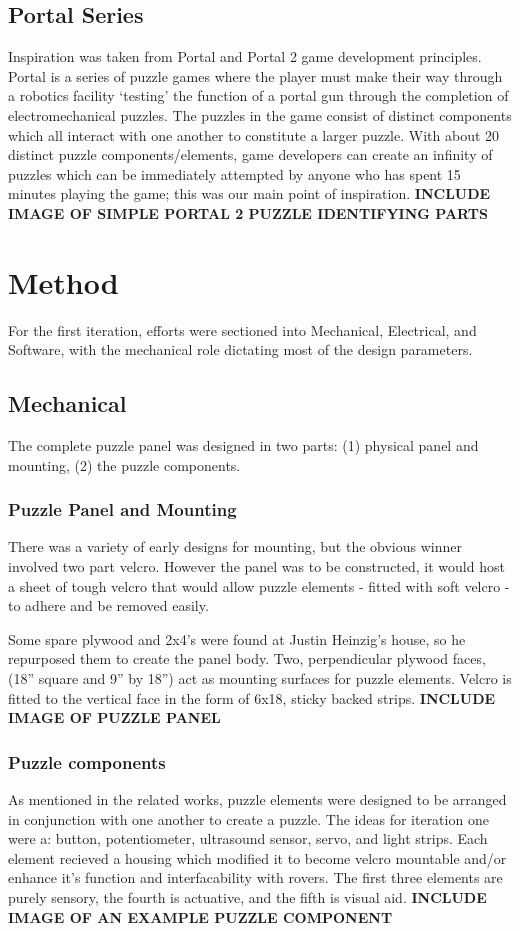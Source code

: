 \documentclass[conference]{IEEEtran}
\begin{document}
	\subsection{Portal Series}
	Inspiration was taken from Portal and Portal 2 game development principles. Portal is a series of puzzle games where the player must make their way through a robotics facility `testing' the function of a portal gun through the completion of electromechanical puzzles. The puzzles in the game consist of distinct components which all interact with one another to constitute a larger puzzle. With about 20 distinct puzzle components/elements, game developers can create an infinity of puzzles which can be immediately attempted by anyone who has spent 15 minutes playing the game; this was our main point of inspiration.
	\textbf{INCLUDE IMAGE OF SIMPLE PORTAL 2 PUZZLE IDENTIFYING PARTS}


\section{Method}
	For the first iteration, efforts were sectioned into Mechanical, Electrical, and Software, with the mechanical role dictating most of the design parameters.

	\subsection{Mechanical}
	The complete puzzle panel was designed in two parts: (1) physical panel and mounting, (2) the puzzle components.  

		\subsubsection{Puzzle Panel and Mounting}
		There was a variety of early designs for mounting, but the obvious winner involved two part velcro. However the panel was to be constructed, it would host a sheet of tough velcro that would allow puzzle elements - fitted with soft velcro - to adhere and be removed easily.
		
		Some spare plywood and 2x4's  were found at Justin Heinzig's house, so he repurposed them to create the panel body. Two, perpendicular plywood faces, (18'' square and 9'' by 18'') act as mounting surfaces for puzzle elements. Velcro is fitted to the vertical face in the form of 6x18, sticky backed strips.
		\textbf{INCLUDE IMAGE OF PUZZLE PANEL}
		
		\subsubsection{Puzzle components}
		As mentioned in the related works, puzzle elements were designed to be arranged in conjunction with one another to create a puzzle. The ideas for iteration one were a: button, potentiometer, ultrasound sensor, servo, and light strips. Each element recieved a housing which modified it to become velcro mountable and/or enhance it's function and interfacability with rovers. The first three elements are purely sensory, the fourth is actuative, and the fifth is visual aid.
		\textbf{INCLUDE IMAGE OF AN EXAMPLE PUZZLE COMPONENT}
\end{document}

